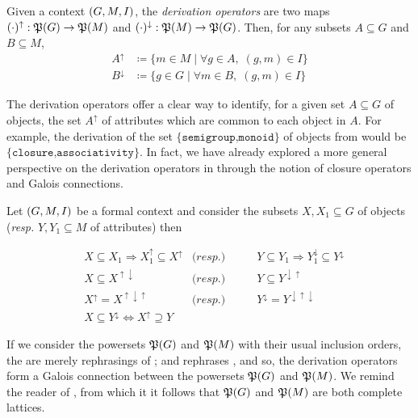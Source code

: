 \begin{definition}
     \label{definition:derivation-operators} 
  Given a context $(G,M,\mathrel{I})$, the \textit{derivation operators} are two maps $(\cdot)^\uparrow : \mathfrak{P}({G}) \to \mathfrak{P}({M})$ and $(\cdot)^\downarrow : \mathfrak{P}({M}) \to \mathfrak{P}({G})$. Then, for any subsets $A \subseteq G$ and $B \subseteq M$,
  \begin{align*}
       A^\uparrow & \coloneqq \{m \in M \mid \forall g \in A, \; (g,m) \in I\} \\
       B^\downarrow & \coloneqq \{g \in G \mid \forall m \in B, \; (g,m) \in I\}
  \end{align*}
\end{definition}

The derivation operators offer a clear way to identify, for a given set $A \subseteq G$ of objects, the set $A^\uparrow$ of attributes which are common to each object in $A$. For example, the derivation of the set $\{\texttt{semigroup,monoid}\}$ of objects from  would be $\{\texttt{closure,associativity}\}$. In fact, we have already explored a more general perspective on the derivation operators in  through the notion of closure operators and Galois connections.

\begin{proposition}
\label{proposition:derivation-operators-galois}
Let $(G,M,\mathrel{I})$ be a formal context and consider the subsets $X,X_1 \subseteq G$ of objects (\textit{resp.} $Y,Y_1 \subseteq M$ of attributes) then

\begin{align}
    & X \subseteq X_1 \Rightarrow X_1^\uparrow \subseteq X^\uparrow & \textit{(resp.)} & \qquad Y \subseteq Y_1 \Rightarrow Y_1^\downarrow \subseteq Y^\downarrow \label{equation:galois-1} \\
    & X \subseteq X^{\uparrow \downarrow} & \textit{(resp.)} & \qquad Y \subseteq Y^{\downarrow \uparrow} \label{equation:galois-2} \\
    & X^\uparrow = X^{\uparrow \downarrow \uparrow}  & \textit{(resp.)} & \qquad  Y^\downarrow = Y^{\downarrow \uparrow \downarrow} \label{equation:galois-3} \\
    & X \subseteq Y^\downarrow \Longleftrightarrow X^\uparrow \supseteq Y & \label{equation:galois-4}
\end{align}
\end{proposition}

If we consider the powersets $\mathfrak{P}({G})$ and $\mathfrak{P}({M})$ with their usual inclusion orders, the  are merely rephrasings of ; and  rephrases , and so, the derivation operators form a Galois connection between the powersets $\mathfrak{P}({G})$ and $\mathfrak{P}({M})$. We remind the reader of , from which it it follows that $\mathfrak{P}({G})$ and $\mathfrak{P}({M})$ are both complete lattices.

